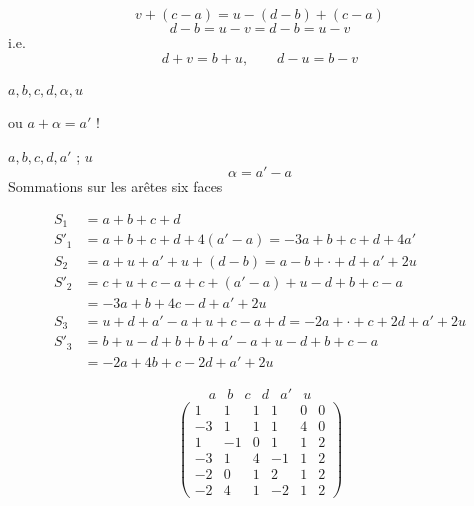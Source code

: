 \documentclass[11pt,a4paper]{article}
\begin{document}

\[
v + (c-a) = u - (d-b) + (c-a)
\]
\[
\boxed{d - b = u - v} = d - b = u - v
\]
i.e.
\[
d + v = b + u,\qquad d - u = b - v
\]

$a, b, c, d, \alpha, u$

ou $a + \alpha = a'$ !

$a, b, c, d, a'$ \struck{\ill{}} ; $u$
\[
\alpha = a' - a
\]
Sommations sur les arêtes  six faces

\begin{align*}
S_1 &= a + b + c + d\\
S'_1 &= a + b + c + d + 4(a'-a) = -3a + b + c + d + 4a'\\
S_2 &= a + u + a' + u + (d-b) = a - b + \cdot + d + a' + 2u\\
S'_2 &= c + u + c - a + c + (a'-a) + u - d + b + c - a\\
&= -3a + b + 4c - d + a' + 2u\\
S_3 &= u + d + a' - a + u + c - a + d = -2a + \cdot + c + 2d + a' + 2u\\
S'_3 &= b + u - d + b + b + a' - a + u - d + b + c - a\\
&= -2a + 4b + c - 2d + a' + 2u
\end{align*}

\[
\begin{array}{cccccc}
a & b & c & d & a' & u
\end{array}
\]
\[
\begin{pmatrix}
1 & 1 & 1 & 1 & 0 & 0\\
-3 & 1 & 1 & 1 & 4 & 0\\
1 & -1 & 0 & 1 & 1 & 2\\
-3 & 1 & 4 & -1 & 1 & 2\\
-2 & 0 & 1 & 2 & 1 & 2\\
-2 & 4 & 1 & -2 & 1 & 2
\end{pmatrix}
\]
\end{document}
